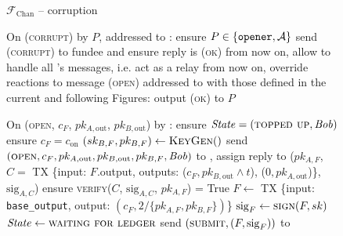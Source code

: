\begin{figure}[H]
  \begin{systembox}{$\mathcal{F}_{\mathrm{Chan}}$ -- corruption}
    \begin{algorithmic}[1]
      \State On (\textsc{corrupt}) by $P$, addressed to \alice:
      \Indent
        \State ensure $P \in \{\mathtt{opener}, \mathcal{A}\}$
          \State send (\textsc{corrupt}) to fundee and ensure reply is
          (\textsc{ok})
        \EndFor
        \State from now on, allow \adversary to handle all \alice's messages,
        i.e. act as a relay
          \State from now on, override reactions to message (\textsc{open})
          addressed to \bob
          with those defined in the current and following Figures:
        \EndIf
        \State output (\textsc{ok}) to $P$
      \EndIndent
      \Statex

      \State On (\textsc{open}, $c_F$, $pk_{A, \mathrm{out}}$, $pk_{B,
      \mathrm{out}}$) by \bob:
      \Indent
        \State ensure $\mathit{State} = (\textsc{topped up}, \mathit{Bob})$ 
        \State ensure $c_F = c_{\mathrm{on}}$
        \State $(sk_{B, F}, pk_{B, F}) \gets \textsc{KeyGen}()$
        \State send $(\textsc{open}, c_F, pk_{A, \mathrm{out}}, pk_{B,
        \mathrm{out}}, pk_{B, F}, \mathit{Bob})$ to \adversary, assign reply to ($pk_{A,
        F}$, $C =$ TX \{input: $F$.output, outputs: ($c_F, pk_{B, \mathrm{out}}
        \wedge t$), ($0, pk_{A, \mathrm{out}}$)\}, $\mathrm{sig}_{A, C}$)
        \State ensure \textsc{verify}($C$, $\mathrm{sig}_{A, C}$, $pk_{A, F}$) =
        True
        \State $F \gets$ TX \{input: \texttt{base\_output}, output: $(c_F,
        2/\{pk_{A, F}, pk_{B, F}\})$\}
        \State $\mathrm{sig}_F \gets \textsc{sign}(F, sk)$
        \State $\mathit{State} \gets \textsc{waiting for ledger}$
        \State send $(\textsc{submit}, (F, \mathrm{sig}_F))$ to \ledger
      \EndIndent
    \end{algorithmic}
  \end{systembox}
  \caption{}
  \label{code:functionality:chan:skeleton:corruption}
\end{figure}

